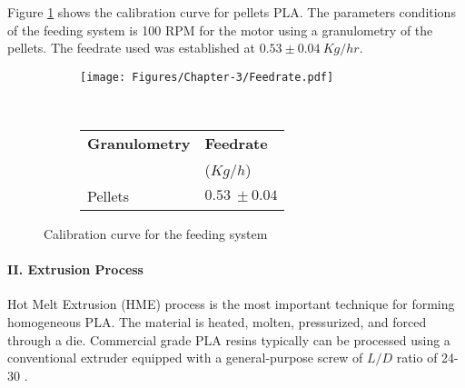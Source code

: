 \begin{enumerate}[leftmargin=0in, label=\emph{\alph*}.]
Figure \ref{feedrate} shows the calibration curve for pellets PLA. 
The parameters conditions of the feeding system is 100 RPM for the motor using a granulometry of the pellets. 	
The feedrate  used was established at $0.53 \pm0.04~Kg/hr$. 
	
	\begin{figure}[H]
		\centering
	
		\begin{subfigure}[p]{0.6\textwidth}
	\texttt{[image: Figures/Chapter-3/Feedrate.pdf]}
		\end{subfigure}
~
		\begin{subfigure}[p]{0.3\textwidth}
				\begin{tabular}[c]{ll}
					\toprule
					\textbf{Granulometry} & \textbf{Feedrate}   \\
					&($Kg/h$)  \\
					\midrule
					Pellets	&  $0.53~\pm0.04$				\\		
					\bottomrule
				\end{tabular}
		\end{subfigure}
	
		\caption{Calibration curve for the feeding system}
		\label{feedrate}
	\end{figure}
	
	
	
	
	
	\paragraph{II. Extrusion Process}\hfill
	
Hot Melt Extrusion (HME) process is the most important technique for forming homogeneous PLA. 
The material is heated, molten, pressurized, and forced through a die. 
Commercial grade PLA resins typically  can be processed using a conventional extruder equipped with a general-purpose screw of $L/D$ ratio of 24-30 \parencite{Lim2008,Lim2010}.
	
	
	

\end{enumerate}

